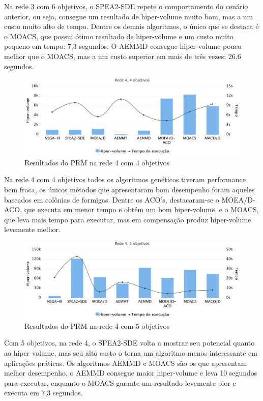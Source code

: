 Na rede 3 com 6 objetivos, o SPEA2-SDE repete o comportamento do cenário anterior, ou seja, consegue um resultado de hiper-volume muito bom, mas a um custo muito alto de tempo. Dentre os demais algoritmos, o único que se destaca é o MOACS, que possui ótimo resultado de hiper-volume e um custo muito pequeno em tempo: 7,3 segundos. O AEMMD consegue hiper-volume pouco melhor que o MOACS, mas a um custo superior em mais de três vezes: 26,6 segundos.

\begin{figure}[!htbp]
	\caption{Resultados do PRM na rede 4 com 4 objetivos}
	\label{fig_exp4_r4o4}
	\includegraphics[width=1\textwidth]{cap_experimentos/figs/etapa4/r4o4}
\end{figure}

Na rede 4 com 4 objetivos todos os algoritmos genéticos tiveram performance bem fraca, os únicos métodos que apresentaram bom desempenho foram aqueles baseados em colônias de formigas. Dentre os ACO's, destacaram-se o MOEA/D-ACO, que executa em menor tempo e obtém um bom hiper-volume, e o MOACS, que leva mais tempo para executar, mas em compensação produz hiper-volume levemente melhor.

\begin{figure}[!htbp]
	\caption{Resultados do PRM na rede 4 com 5 objetivos}
	\label{fig_exp4_r4o5}
	\includegraphics[width=1\textwidth]{cap_experimentos/figs/etapa4/r4o5}
\end{figure}

Com 5 objetivos, na rede 4, o SPEA2-SDE volta a mostrar seu potencial quanto ao hiper-volume, mas seu alto custo o torna um algoritmo menos interessante em aplicações práticas. Os algoritmos AEMMD e MOACS são os que apresentam melhor desempenho, o AEMMD consegue maior hiper-volume e leva 10 segundos para executar, enquanto o MOACS garante um resultado levemente pior e executa em 7,3 segundos.

